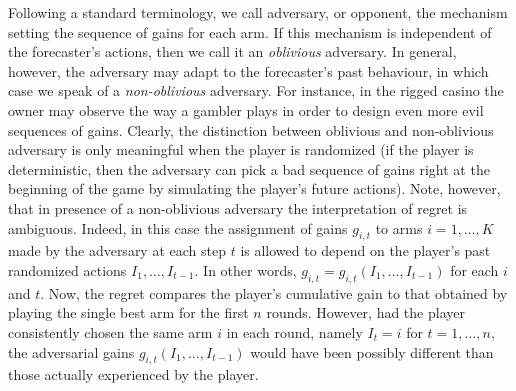 \documentclass[11pt]{hackednow}
\begin{document}
Following a standard terminology, we call adversary, or opponent, the mechanism setting the sequence of gains for each arm. If this mechanism is independent of the forecaster's actions, then we call it an \textsl{oblivious} adversary. In general, however, the adversary may adapt to the forecaster's past behaviour, in which case we speak of a \textsl{non-oblivious} adversary. For instance, in the rigged casino the owner may observe the way a gambler plays in order to design even more evil sequences of gains.
Clearly, the distinction between oblivious and non-oblivious adversary is only meaningful when the player is randomized (if the player is deterministic, then the adversary can pick a bad sequence of gains right at the beginning of the game by simulating the player's future actions). Note, however, that in presence of a non-oblivious adversary the interpretation of regret is ambiguous. Indeed, in this case the assignment of gains $g_{i,t}$ to arms $i=1,\dots,K$ made by the adversary at each step $t$ is allowed to depend on the player's past randomized actions $I_1,\dots,I_{t-1}$. In other words, $g_{i,t} = g_{i,t}(I_1,\dots,I_{t-1})$ for each $i$ and $t$. Now, the regret compares the player's cumulative gain to that obtained by playing the single best arm for the first $n$ rounds. However, had the player consistently chosen the same arm $i$ in each round, namely $I_t = i$ for $t=1,\dots,n$, the adversarial gains $g_{i,t}(I_1,\dots,I_{t-1})$ would have been possibly different than those actually experienced by the player.
\end{document}
